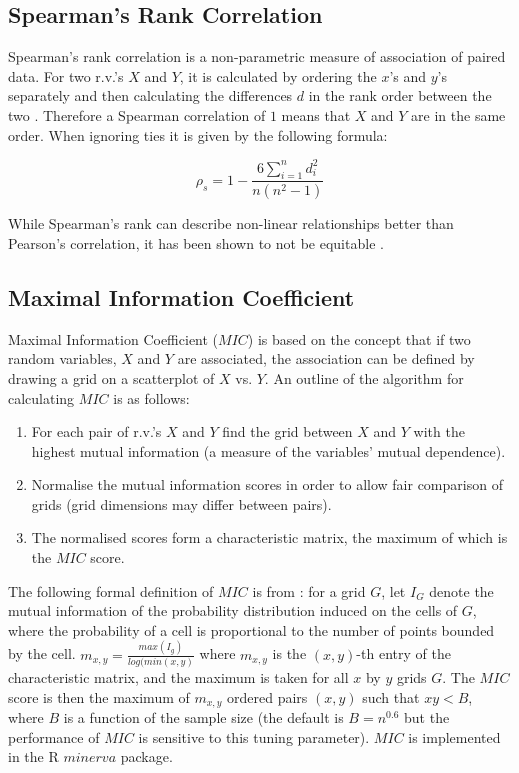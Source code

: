 \documentclass[a4paper, 12pt]{report}
\begin{document}
\subsection*{Spearman's Rank Correlation}
Spearman's rank correlation is a non-parametric measure of association of paired data. For two r.v.'s $X$ and $Y$, it is calculated by ordering the $x$'s and $y$'s separately and then calculating the differences $d$ in the rank order between the two \cite{MSA}. Therefore a Spearman correlation of $1$ means that $X$ and $Y$ are in the same order. When ignoring ties it is given by the following formula:

\[
\rho_s = 1-\frac{6 \sum_{i=1}^n d_i^2}{n(n^2-1)}
\]

While Spearman's rank can describe non-linear relationships better than Pearson's correlation, it has been shown to not be equitable \cite{mic2011}.


\subsection*{Maximal Information Coefficient}
Maximal Information Coefficient ($MIC$) is based on the concept that if two random variables, $X$ and $Y$ are associated, the association can be defined by drawing a grid on a scatterplot of $X$ vs. $Y$. An outline of the algorithm for calculating $MIC$ is as follows:

\begin{enumerate}
\item For each pair of r.v.'s $X$ and $Y$ find the grid between $X$ and $Y$ with the highest mutual information (a measure of the variables' mutual dependence).%
\item Normalise the mutual information scores in order to allow fair comparison of grids (grid dimensions may differ between pairs).
\item The normalised scores form a characteristic matrix, the maximum of which is the $MIC$ score.
\end{enumerate}

The following formal definition of $MIC$ is from \citet{mic2011}: for a grid $G$, let $I_G$ denote the mutual information of the probability distribution induced on the cells of $G$, where the probability of a cell is proportional to the number of points bounded by the cell. $m_{x,y} = \frac{max(I_g)}{log(min(x,y)}$ where $m_{x,y}$ is the $(x,y)$-th entry of the characteristic matrix, and the maximum is taken for all $x$ by $y$ grids $G$. The $MIC$ score is then the maximum of $m_{x,y}$ ordered pairs $(x,y)$ such that $xy < B$, where $B$ is a function of the sample size (the default is $B=n^{0.6}$ but the performance of $MIC$ is sensitive to this tuning parameter).  $MIC$ is implemented in the R $minerva$ \cite{minerva} package.
\end{document}

